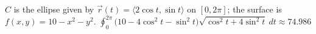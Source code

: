 {$C$ is the ellipse given by $\vec r(t) = \langle 2\cos t,\sin t\rangle$ on $[0,2\pi]$; the surface is $f(x,y)=10-x^2-y^2$.
}
{$\oint_0^{2\pi} \big(10-4\cos^2t-\sin^2t\big)\sqrt{\cos^2t+4\sin^2t}\ dt \approx 74.986$
}
